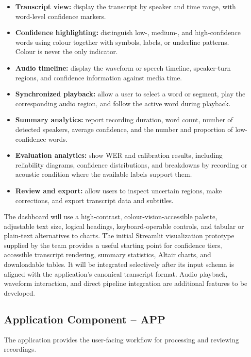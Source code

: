 \documentclass[11pt,a4paper]{article}
\begin{document}
\begin{itemize}
  \item \textbf{Transcript view:} display the transcript by speaker and
  time range, with word-level confidence markers.
  \item \textbf{Confidence highlighting:} distinguish low-, medium-, and
  high-confidence words using colour together with symbols, labels, or
  underline patterns. Colour is never the only indicator.
  \item \textbf{Audio timeline:} display the waveform or speech timeline,
  speaker-turn regions, and confidence information against media time.
  \item \textbf{Synchronized playback:} allow a user to select a word or
  segment, play the corresponding audio region, and follow the active word
  during playback.
  \item \textbf{Summary analytics:} report recording duration, word count,
  number of detected speakers, average confidence, and the number and
  proportion of low-confidence words.
  \item \textbf{Evaluation analytics:} show WER and calibration results,
  including reliability diagrams, confidence distributions, and breakdowns
  by recording or acoustic condition where the available labels support them.
  \item \textbf{Review and export:} allow users to inspect uncertain regions,
  make corrections, and export transcript data and subtitles.
\end{itemize}

The dashboard will use a high-contrast, colour-vision-accessible palette,
adjustable text size, logical headings, keyboard-operable controls, and
tabular or plain-text alternatives to charts. The initial Streamlit
visualization prototype supplied by the team provides a useful starting
point for confidence tiers, accessible transcript rendering, summary
statistics, Altair charts, and downloadable tables. It will be integrated
selectively after its input schema is aligned with the application's
canonical transcript format. Audio playback, waveform interaction, and
direct pipeline integration are additional features to be developed.

\subsection{Application Component -- APP}

The application provides the user-facing workflow for processing and
reviewing recordings.
\end{document}
